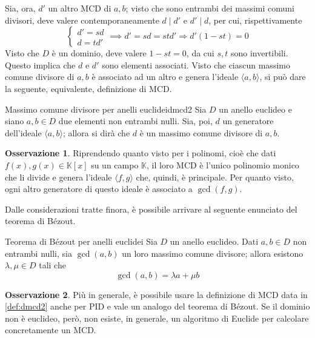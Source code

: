 \documentclass[11pt, a4paper]{scrartcl}
\theoremstyle{definition}
\numberwithin{esempio}{section}
\theoremstyle{definition}
\newtheorem{obs}{Osservazione}
\numberwithin{obs}{section}
\numberwithin{nota}{section}
\numberwithin{equation}{subsection}
\begin{document}
Sia, ora, $d'$ un altro MCD di $a,b$; visto che sono entrambi dei massimi comuni divisori, deve valere contemporaneamente $d  \mid d'$ e $d' \mid d$, per cui, rispettivamente
\[
\begin{cases}
	d' = sd\\
	d = td'
\end{cases}\implies d'=sd = std'\Rightarrow d'(1-st) = 0
\] 
Visto che $D$ \`e un dominio, deve valere $1-st = 0$, da cui $s,t$ sono invertibili.
Questo implica che $d$ e $d'$ sono elementi associati.
Visto che ciascun massimo comune divisore di $a,b$ \`e associato ad un altro e genera l'ideale $\langle a,b \rangle$, si pu\`o dare la seguente, equivalente, definizione di MCD.
\begin{definizione}
	{Massimo comune divisore per anelli euclidei}{dmcd2}
	Sia $D$ un anello euclideo e siano $a,b \in D$ due elementi non entrambi nulli.
	Sia, poi, $d$ un generatore dell'ideale $\langle a,b \rangle$; allora si dir\`a che $d$ \`e un massimo comune divisore di $a,b$.
\end{definizione}
\begin{obs}
	Riprendendo quanto visto per i polinomi, cio\`e che dati $f(x),g(x) \in \mathbb{K}[x]$ su un campo $\mathbb{K}$, il loro MCD \`e l'unico polinomio monico che li divide e genera l'ideale $\langle f,g \rangle$ che, quindi, \`e principale.
	Per quanto visto, ogni altro generatore di questo ideale \`e associato a $\operatorname{gcd}(f,g) $.
\end{obs}
\noindent Dalle considerazioni tratte finora, \`e possibile arrivare al seguente enunciato del teorema di B\'ezout.
\begin{teorema}
	{Teorema di B\'ezout per anelli euclidei}{}
	Sia $D$ un anello euclideo. 
	Dati $a,b \in D$ non entrambi nulli, sia $\operatorname{gcd}(a,b) $ un loro massimo comune divisore; allora esistono $\lambda ,\mu  \in D$ tali che
	\[
	\operatorname{gcd}(a,b) = \lambda a + \mu b
	\] 
\end{teorema}
\begin{obs}
	Pi\`u in generale, \`e possibile usare la definizione di MCD data in \ref{def:dmcd2} anche per PID e vale un analogo del teorema di B\'ezout.
	Se il dominio non \`e euclideo, per\`o, non esiste, in generale, un algoritmo di Euclide per calcolare concretamente un MCD.
\end{obs}
\end{document}
